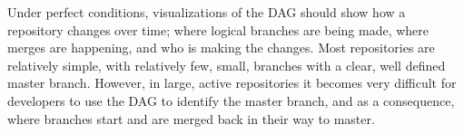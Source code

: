 Under perfect conditions, visualizations of the DAG should show how a
repository changes over time; where logical branches are being made,
where merges are happening, and who is making the changes. Most
repositories are relatively simple, with
relatively few, small, branches with a clear, well defined
master branch. However, in large, active repositories it becomes very difficult for developers to use the DAG
to identify
the master branch, and as a consequence, where branches start and are merged back in their
way to master. 

